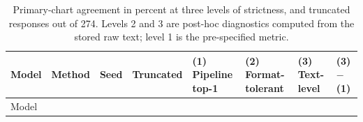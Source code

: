\begin{landscape}
\begingroup\scriptsize\setlength{\tabcolsep}{1pt}\sloppy
\begin{longtable}[]{@{}
  >{\raggedright\arraybackslash}p{}
  >{\raggedright\arraybackslash}p{}
  >{\raggedleft\arraybackslash}p{}
  >{\raggedleft\arraybackslash}p{}
  >{\raggedleft\arraybackslash}p{}
  >{\raggedleft\arraybackslash}p{}
  >{\raggedleft\arraybackslash}p{}
  >{\raggedleft\arraybackslash}p{}@{}}
\caption{Primary-chart agreement in percent at three levels of strictness, and truncated responses out of 274. Levels 2 and 3 are post-hoc diagnostics computed from the stored raw text; level 1 is the pre-specified metric.}\tabularnewline
\toprule\noalign{}
\begin{minipage}[b]{\linewidth}\raggedright
Model
\end{minipage} & \begin{minipage}[b]{\linewidth}\raggedright
Method
\end{minipage} & \begin{minipage}[b]{\linewidth}\raggedleft
Seed
\end{minipage} & \begin{minipage}[b]{\linewidth}\raggedleft
Truncated
\end{minipage} & \begin{minipage}[b]{\linewidth}\raggedleft
(1) Pipeline top-1
\end{minipage} & \begin{minipage}[b]{\linewidth}\raggedleft
(2) Format-tolerant
\end{minipage} & \begin{minipage}[b]{\linewidth}\raggedleft
(3) Text-level
\end{minipage} & \begin{minipage}[b]{\linewidth}\raggedleft
(3) \ensuremath{-} (1)
\end{minipage} \\
\midrule\noalign{}
\endfirsthead
\toprule\noalign{}
\begin{minipage}[b]{\linewidth}\raggedright
Model
\end{minipage} & \begin{minipage}[b]{\linewidth}\raggedright

\end{minipage}
\end{longtable}
\end{landscape}
